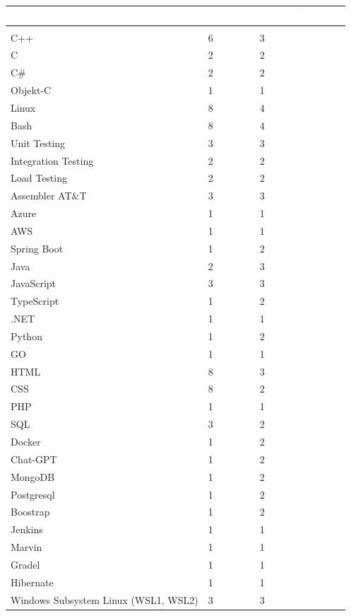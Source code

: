 \documentclass{article}
\begin{document}
\begin{tabular}{|l|l|l|}
\hline
\rowcolor{colorBlue}
\multicolumn{1}{|l|}{\textcolor{white}{\textbf{Kompetens}}} & \multicolumn{1}{l|}{\textcolor{white}{\textbf{Antal år}}} & \multicolumn{1}{l|}{\textcolor{white}{\textbf{Skicklighetsgrad}}} \\
\hline
\rowcolor{colorBlueTwo}
\multicolumn{3}{|l|}{\textcolor{white}{\textbf{Teknisk kunskap}}} \\
\hline
C++ & 6 & 3 \\
\hline
C & 2 & 2 \\
\hline
C\# & 2 & 2 \\
\hline
Objekt-C & 1 & 1 \\
\hline
Linux & 8 & 4 \\
\hline
Bash & 8 & 4 \\
\hline
Unit Testing & 3 & 3 \\
\hline
Integration Testing & 2 & 2 \\
\hline
Load Testing & 2 & 2 \\
\hline
Assembler AT\&T & 3 & 3 \\
\hline
Azure & 1 & 1 \\
\hline
AWS & 1 & 1 \\
\hline
Spring Boot & 1 & 2 \\
\hline
Java & 2 & 3 \\
\hline
JavaScript & 3 & 3 \\
\hline
TypeScript & 1 & 2 \\
\hline
.NET & 1 & 1 \\
\hline
Python & 1 & 2 \\
\hline
GO & 1 & 1 \\
\hline
HTML & 8 & 3 \\
\hline
CSS & 8 & 2 \\
\hline
PHP & 1 & 1 \\
\hline
SQL & 3 & 2 \\
\hline
Docker & 1 & 2 \\
\hline
Chat-GPT & 1 & 2 \\
\hline
MongoDB & 1 & 2 \\
\hline
Postgresql&1 & 2 \\
\hline
Boostrap & 1 & 2 \\
\hline
Jenkins & 1 & 1 \\
\hline
Marvin & 1 & 1 \\
\hline
Gradel & 1 & 1 \\
\hline
Hibernate & 1& 1 \\
\hline
Windows Subsystem Linux (WSL1, WSL2) & 3 & 3 \\

\end{tabular}
\end{document}
